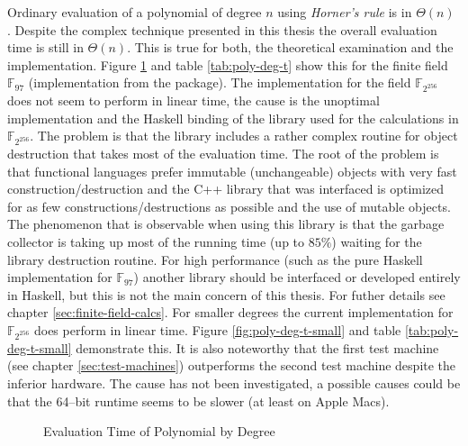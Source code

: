 Ordinary evaluation of a polynomial of degree $n$ using \emph{Horner's rule} is
in $\Theta(n)$ \cite{cormen01}. Despite the complex technique presented in this
thesis the overall evaluation time is still in $\Theta(n)$. This is true for
both, the theoretical examination and the implementation. Figure
\ref{fig:poly-deg-t} and table \ref{tab:poly-deg-t} show this for the finite
field $\mathbb{F}_{97}$ (implementation from the \JWTLhaskellForMaths{}
package). The implementation for the field $\mathbb{F}_{2^{256}}$ does not seem
to perform in linear time, the cause is the unoptimal implementation and the
Haskell binding of the library used for the calculations in
$\mathbb{F}_{2^{256}}$. The problem is that the library includes a rather
complex routine for object destruction that takes most of the evaluation time.
The root of the problem is that functional languages prefer immutable
(unchangeable) objects with very fast construction/destruction and the C++
library that was interfaced is optimized for as few constructions/destructions
as possible and the use of mutable objects. The phenomenon that is observable
when using this library is that the garbage collector is taking up most of the
running time (up to $85\%$) waiting for the library destruction routine. For
high performance (such as the pure Haskell implementation for $\mathbb{F}_{97}$)
another library should be interfaced or developed entirely in Haskell, but this
is not the main concern of this thesis. For futher details see chapter
\ref{sec:finite-field-calcs}. For smaller degrees the current implementation for
$\mathbb{F}_{2^{256}}$ does perform in linear time. Figure
\ref{fig:poly-deg-t-small} and table \ref{tab:poly-deg-t-small} demonstrate
this. It is also noteworthy that the first test machine (see chapter
\ref{sec:test-machines}) outperforms the second test machine despite the
inferior hardware. The cause has not been investigated, a possible causes could
be that the 64--bit \JWTghc{} runtime seems to be slower (at least on Apple
Macs)\cite{lentczner11}.


\begin{figure}[ht]
  \centering
  
  \caption{Evaluation Time of Polynomial by Degree}
  \label{fig:poly-deg-t}
\end{figure}

